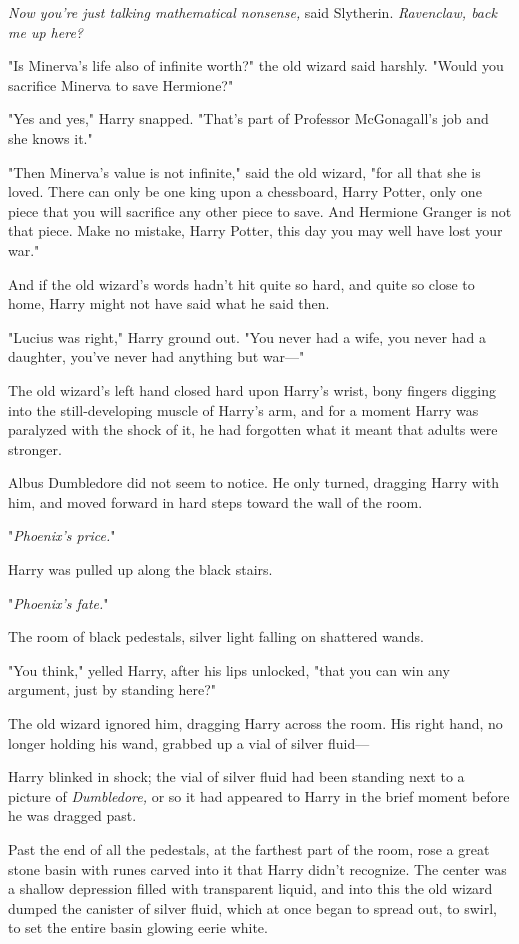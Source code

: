 \emph{Now you're just talking mathematical nonsense,} said Slytherin.
\emph{Ravenclaw, back me up here?}

"Is Minerva's life also of infinite worth?" the old wizard said harshly. "Would
you sacrifice Minerva to save Hermione?"

"Yes and yes," Harry snapped. "That's part of Professor McGonagall's job and
she knows it."

"Then Minerva's value is not infinite," said the old wizard, "for all that she
is loved. There can only be one king upon a chessboard, Harry Potter, only one
piece that you will sacrifice any other piece to save. And Hermione Granger is
not that piece. Make no mistake, Harry Potter, this day you may well have lost
your war."

And if the old wizard's words hadn't hit quite so hard, and quite so close to
home, Harry might not have said what he said then.

"Lucius was right," Harry ground out. "You never had a wife, you never had a
daughter, you've never had anything but war—"

The old wizard's left hand closed hard upon Harry's wrist, bony fingers digging
into the still-developing muscle of Harry's arm, and for a moment Harry was
paralyzed with the shock of it, he had forgotten what it meant that adults were
stronger.

Albus Dumbledore did not seem to notice. He only turned, dragging Harry with
him, and moved forward in hard steps toward the wall of the room.

"\emph{Phoenix's price.}"

Harry was pulled up along the black stairs.

"\emph{Phoenix's fate.}"

The room of black pedestals, silver light falling on shattered wands.

"You think," yelled Harry, after his lips unlocked, "that you can win any
argument, just by standing here?"

The old wizard ignored him, dragging Harry across the room. His right hand, no
longer holding his wand, grabbed up a vial of silver fluid—

Harry blinked in shock; the vial of silver fluid had been standing next to a
picture of \emph{Dumbledore,} or so it had appeared to Harry in the brief
moment before he was dragged past.

Past the end of all the pedestals, at the farthest part of the room, rose a
great stone basin with runes carved into it that Harry didn't recognize. The
center was a shallow depression filled with transparent liquid, and into this
the old wizard dumped the canister of silver fluid, which at once began to
spread out, to swirl, to set the entire basin glowing eerie white.

